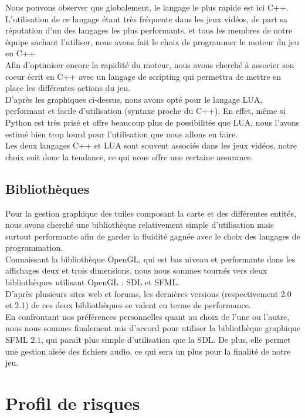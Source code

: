 \documentclass[a4paper]{article}
\newcommand{\alinea}{\hspace*{0.5cm}}
\begin{document}
        \alinea Nous pouvons observer que globalement, le langage le plus rapide est ici C++. L'utilisation de ce langage étant très fréquente dans les jeux vidéos, de part sa réputation d'un des langages les plus performants, et tous les membres de notre équipe sachant l'utiliser, nous avons fait le choix de programmer le moteur du jeu en C++.\\
        \alinea Afin d'optimiser encore la rapidité du moteur, nous avons cherché à associer son coeur écrit en C++ avec un langage de scripting qui permettra de mettre en place les différentes actions du jeu.\\ D'après les graphiques ci-dessus, nous avons opté pour le langage LUA, performant et facile d'utilisation (syntaxe proche du C++). En effet, même si Python est très prisé et offre beaucoup plus de possibilités que LUA, nous l'avons estimé bien trop lourd pour l'utilisation que nous allons en faire.\\
        \alinea Les deux langages C++ et LUA sont souvent associés dans les jeux vidéos, notre choix suit donc la tendance, ce qui nous offre une certaine assurance.

      \subsection{Bibliothèques}
        \alinea Pour la gestion graphique des tuiles composant la carte et des différentes entités, nous avons cherché une bibliothèque relativement simple d'utilisation mais surtout performante afin de garder la fluidité gagnée avec le choix des langages de programmation.\\
        \alinea Connaissant la bibliothèque OpenGL, qui est bas niveau et performante dans les affichages deux et trois dimensions, nous nous sommes tournés vers deux bibliothèques utilisant OpenGL : SDL et SFML.\\
        \alinea D'après plusieurs sites web et forums, les dernières versions (respectivement 2.0 et 2.1) de ces deux bibliothèques se valent en terme de performance.\\
        \alinea En confrontant nos préférences personnelles quant au choix de l'une ou l'autre, nous nous sommes finalement mis d'accord pour utiliser la bibliothèque graphique SFML 2.1, qui paraît plus simple d'utilisation que la SDL. De plus, elle permet une gestion aisée des fichiers audio, ce qui sera un plus pour la finalité de notre jeu.

    \section{Profil de risques}
	
\end{document}
